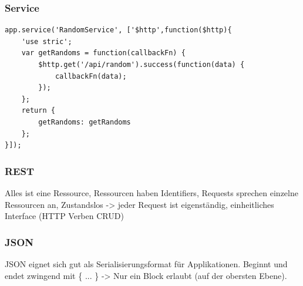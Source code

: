 \begin{multicols*}{4}
\subsubsection{Service}
\begin{verbatim}
app.service('RandomService', ['$http',function($http){
    'use stric';
    var getRandoms = function(callbackFn) {
        $http.get('/api/random').success(function(data) {
            callbackFn(data);
        });
    };
    return {
        getRandoms: getRandoms
    };
}]);
\end{verbatim}
\subsubsection{REST}
Alles ist eine Ressource, Ressourcen haben Identifiers, Requests sprechen einzelne Ressourcen an, 
Zustandslos -> jeder Request ist eigenständig, einheitliches Interface (HTTP Verben CRUD)
\subsubsection{JSON}
JSON eignet sich gut als Serialisierungsformat für Applikationen. 
Beginnt und endet zwingend mit \{ ... \} -> Nur ein Block erlaubt (auf der obersten Ebene).

\end{multicols*}
